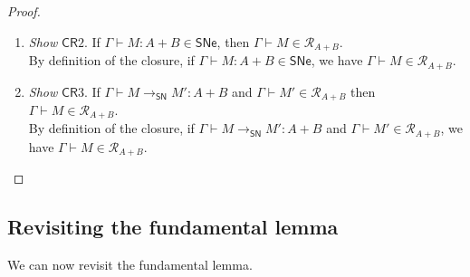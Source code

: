 \documentclass{article}
\newcommand{\SN}{\mathsf{SN}}
\newcommand{\SNe}{\mathsf{SNe}}
\newcommand{\CR}{\textsf{CR}}
\newcommand{\denot}[1]{\mathcal{R}_{#1}}
\newcommand{\inden}[3]{#1 \vdash #2 \in \denot{#3}}
\newcommand{\redSN}{\longrightarrow_\SN}
\begin{document}
\begin{proof}
\begin{enumerate}
 \item \textit{Show} $\CR2$. If $\Gamma \vdash M : A + B \in \SNe$, then $\inden{\Gamma}{M}{A + B}$. \\
By definition of the closure, if $\Gamma \vdash M : A + B \in \SNe$, we have $\inden{\Gamma}{M}{A + B}$.


  \item \textit{Show} $\CR3$. If $\Gamma \vdash M \redSN M' : A + B$ and $\inden{\Gamma}{M'}{A+B}$
    then $\inden{\Gamma}{M}{A+B}$.\\
By definition of the closure, if $\Gamma \vdash M \redSN M' : A + B$ and $\inden{\Gamma}{M'}{A+B}$, we have
$\inden{\Gamma}{M}{A+B}$.
\end{enumerate}

\end{proof}


 \subsection{Revisiting the fundamental lemma}

 We can now revisit the fundamental lemma.
\end{document}
